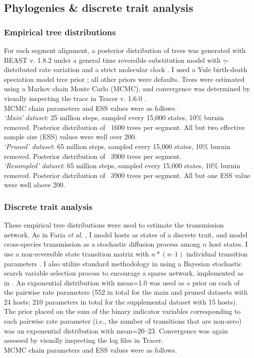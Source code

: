 \subsection*{Phylogenies \& discrete trait analysis}
\subsubsection*{Empirical tree distributions}
For each segment alignment, a posterior distribution of trees was generated with BEAST v. 1.8.2 under a general time reversible substitution model with $\gamma$- distributed rate variation and a strict molecular clock \citep{drummond2012bayesian}.
I used a Yule birth-death speciation model tree prior \citep{gernhard2008using}; all other priors were defaults.
Trees were estimated using a Markov chain Monte Carlo (MCMC), and convergence was determined by visually inspecting the trace in Tracer v. 1.6.0 \citep{rambaut2014tracer}.\\
MCMC chain parameters and ESS values were as follows.\\
\textit{`Main' dataset}: 25 million steps, sampled every 15,000 states, 10\% burnin removed. Posterior distribution of ~1600 trees per segment. All but two effective sample size (ESS) values were well over 200. \\
\textit{`Pruned' dataset}: 65 million steps, sampled every 15,000 states, 10\% burnin removed. Posterior distribution of ~3900 trees per segment. \\
\textit{`Resampled' dataset}: 65 million steps, sampled every 15,000 states, 10\% burnin removed. Posterior distribution of ~3900 trees per segment. All but one ESS value were well above 200.

\subsubsection*{Discrete trait analysis}
These empirical tree distributions were used to estimate the transmission network.
As in Faria \textit{et al}. \citep{faria2013simultaneously}, I model hosts as states of a discrete trait, and model cross-species transmission as a stochastic diffusion process among $n$ host states.
I use a non-reversible state transition matrix with $n * (n–1)$ individual transition parameters \citep{edwards2011ancient}.
I also utilize standard methodology in using a Bayesian stochastic search variable selection process to encourage a sparse network, implemented as in \citep{lemey2009bayesian}.
An exponential distribution with mean=1.0 was used as a prior on each of the pairwise rate parameters (552 in total for the main and pruned datasets with 24 hosts; 210 parameters in total for the supplemental dataset with 15 hosts).
The prior placed on the sum of the binary indicator variables corresponding to each pairwise rate parameter (i.e., the number of transitions that are non-zero) was an exponential distribution with mean=20--23.
Convergence was again assessed by visually inspecting the log files in Tracer.\\
MCMC chain parameters and ESS values were as follows.\\

